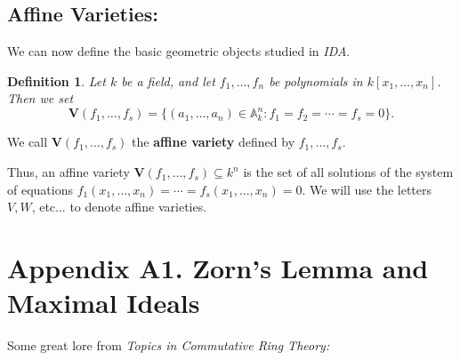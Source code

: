 \documentclass[12pt,reqno]{amsart}
\theoremstyle{plain}
\newtheorem{defi}{Definition}
\newcommand{\aff}{\mathbb A}
\newcommand{\pring}{k[x_1, \ldots , x_n]}
\newcommand{\V}{\mathbf V}
\begin{document}
\subsection{Affine Varieties:} 

We can now define the basic geometric objects studied in \textit{IDA}.

\begin{defi} Let $k$ be a field, and let $f_1, \ldots, f_n$ be polynomials in $\pring$. Then we set $$\V (f_1, \ldots , f_s) = \{ (a_1, \ldots, a_n) \in \aff^n_k \colon f_1 = f_2 = \cdots = f_s = 0 \}.$$
\end{defi} 
We call $\V (f_1, \ldots, f_s)$ the \textbf{affine variety} defined by $f_1, \ldots, f_s$.

Thus, an affine variety $\V (f_1, \ldots, f_s) \subseteq k^n $ is the set of all solutions of the system of equations $f_1 (x_1, \ldots, x_n) = \cdots = f_s (x_1, \ldots, x_n ) = 0$. We will use the letters $V, W$, etc... to denote affine varieties.
\newpage
\section{Appendix A1. Zorn’s Lemma and Maximal Ideals}

Some great lore from \textit{Topics in Commutative Ring Theory:}
\end{document}
